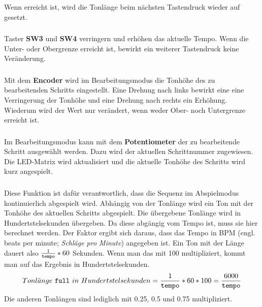 \noindent Wenn  erreicht ist, wird die Tonlänge beim nächsten Tastendruck wieder auf  gesetzt.

\subsubsection{} %
\label{ssub:void_button_sw3_pressed}
Taster \textbf{SW3} und \textbf{SW4} verringern und erhöhen das aktuelle Tempo. Wenn die Unter- oder Obergrenze erreicht ist, bewirkt ein weiterer Tastendruck keine Veränderung.

\subsubsection{} %
\label{ssub:void_encoder_left&right}
Mit dem \textbf{Encoder} wird im Bearbeitungsmodus die Tonhöhe des zu bearbeitenden Schritts eingestellt. Eine Drehung nach links bewirkt eine eine Verringerung der Tonhöhe und eine Drehung nach rechts ein Erhöhung. Wiederum wird der Wert nur verändert, wenn weder Ober- noch Untergrenze erreicht ist.

\subsubsection{} %
\label{ssub:void_potentionmeter_turned}
Im Bearbeitungsmodus kann mit dem \textbf{Potentiometer} der zu bearbeitende Schritt ausgewählt werden. Dazu wird  der aktuellen Schrittnummer  zugewiesen. Die LED-Matrix wird aktualisiert und die aktuelle Tonhöhe des Schritts wird kurz angespielt.

\subsubsection{} %
\label{ssub:void_play_next_step}
Diese Funktion ist dafür verantwortlich, dass die Sequenz im Abspielmodus kontinuierlich abgespielt wird. Abhängig von der Tonlänge wird ein Ton mit der Tonhöhe des aktuellen Schritts abgespielt. Die übergebene Tonlänge wird in Hundertstelsekunden übergeben. Da diese abgängig vom Tempo ist, muss sie hier berechnet werden. Der Faktor ergibt sich daraus, dass das Tempo in BPM (engl. beats per minute; \emph{Schläge pro Minute}) angegeben ist. Ein Ton mit der Länge  dauert also \(\frac{1}{\texttt{tempo}}*60\) Sekunden. Wenn man das mit 100 multipliziert, kommt man auf das Ergebnis in Hundertstelsekunden.
\[
Tonl\ddot{a}nge~\texttt{full}~in~Hundertstelsekunden=\frac{1}{\texttt{tempo}}*60*100=\frac{6000}{\texttt{tempo}}
\]
Die anderen Tonlängen sind lediglich mit 0.25, 0.5 und 0.75 multipliziert.\newline

